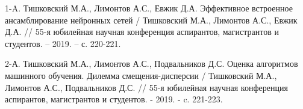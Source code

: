 
1-A. Тишковский М.А., Лимонтов А.С., Евжик Д.А. Эффективное встроенное ансамблирование нейронных сетей / Тишковский М.А., Лимонтов А.С., Евжик Д.А. // 55-я юбилейная научная конференция аспирантов, магистрантов и студентов. – 2019. – с. 220-221.

2-А. Тишковский М.А., Лимонтов А.С., Подвальников Д.С. Оценка алгоритмов машинного обучения. Дилемма смещения-дисперсии / Тишковский М.А., Лимонтов А.С., Подвальников Д.С. // 55-я юбилейная научная конференция аспирантов, магистрантов и студентов. - 2019. - c. 221-223.
